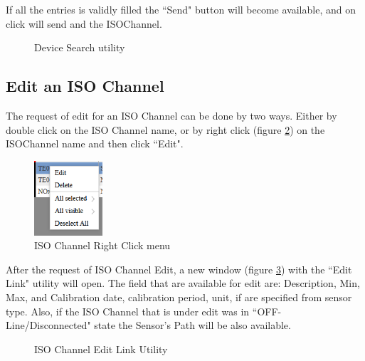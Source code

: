 If all the entries is validly filled the ``Send" button will become available, and on click will send and the ISOChannel.

\begin{figure}[h]
\centering
	\caption{Device Search utility}
	\label{fig:Device_Search}
\end{figure}

\newpage
\subsection{Edit an ISO Channel}
The request of edit for an ISO Channel can be done by two ways.
Either by double click on the ISO Channel name,
or by right click (figure \ref{fig:right_click}) on the ISOChannel name and then click ``Edit".

\begin{figure}[h]
\centering
	\includegraphics[width=1in,angle=0]{../art/Morfeas_web_if/right_click.png}
	\caption{ISO Channel Right Click menu}
	\label{fig:right_click}
\end{figure}

After the request of ISO Channel Edit, a new window (figure \ref{fig:edit_link}) with the ``Edit Link" utility will open.
The field that are available for edit are: Description, Min, Max, and Calibration date, calibration period, unit, if are specified from sensor type.
Also, if the ISO Channel that is under edit was in ``OFF-Line/Disconnected" state the Sensor's Path will be also available.

\begin{figure}[h]
\centering
	\caption{ISO Channel Edit Link Utility}
	\label{fig:edit_link}
\end{figure}

